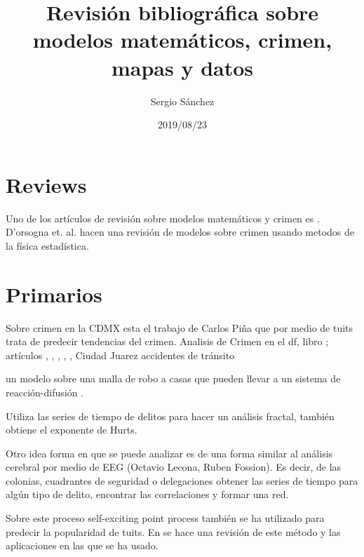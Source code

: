 \documentclass[onecolumn,12pt,letterpaper]{article}
\title{Revisión bibliográfica sobre modelos matemáticos, crimen, mapas y datos}
\author{Sergio Sánchez}
\date{2019/08/23}
\begin{document}
\maketitle

\section{Reviews}

Uno de los artículos de revisión sobre modelos matemáticos y crimen es \cite{gordon_random_2010}. D'orsogna et. al.\cite{dorsogna_statistical_2015} hacen una revisión de modelos sobre crimen usando metodos de la física estadística.

\section{Primarios}



Sobre crimen en la CDMX esta el trabajo de Carlos Piña\cite{pina-garcia_exploring_2019} que por medio de tuits trata de predecir tendencias del crimen. Analisis de Crimen en el df, libro \cite{mendoza_tamano_2012}; artículos \cite{mata_mobile_2016}, \cite{vilalta_what_2016}, \cite{sanchez_salinas_robo_2016}, \cite{fuentes_flores_distribucion_2017}, \cite{cisneros_geografimiedo_2008}, Ciudad Juarez accidentes de tránsito\cite{hernandez_hernandez_alisis_2012}


un modelo sobre una malla de robo a casas que pueden llevar a un sistema de reacción-difusión \cite{short_statistical_2008}.


Utiliza las series de tiempo de delitos para hacer un análisis fractal, también obtiene el exponente de Hurts\cite{melgarejo_multifractal_2017}.  

Otro idea forma en que se puede analizar es de una forma similar al análisis cerebral por medio de EEG (Octavio Lecona, Ruben Fossion). Es decir, de las colonias, cuadrantes de seguridad o delegaciones obtener las series de tiempo para algún tipo de delito, encontrar las correlaciones y formar una red. 



Sobre este proceso self-exciting point process también se ha utilizado para predecir la popularidad de tuits\cite{zhao2015seismic}. En \cite{reinhart2018review} se hace una revisión de este método y las aplicaciones en las que se ha usado. 
\end{document}
